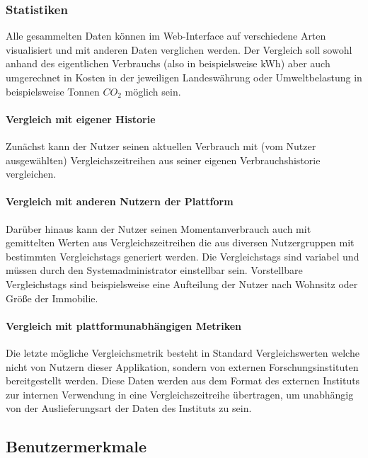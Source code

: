 \subsubsection{Statistiken}

Alle gesammelten Daten können im Web-Interface auf verschiedene Arten visualisiert und mit anderen Daten verglichen werden. Der Vergleich soll sowohl anhand des eigentlichen Verbrauchs (also in beispielsweise kWh) aber auch umgerechnet in Kosten in der jeweiligen Landeswährung oder Umweltbelastung in beispielsweise Tonnen $CO_2$ möglich sein.

\paragraph{Vergleich mit eigener Historie}

Zunächst kann der Nutzer seinen aktuellen Verbrauch  mit (vom Nutzer ausgewählten) Vergleichszeitreihen aus seiner eigenen Verbrauchshistorie vergleichen.


\paragraph{Vergleich mit anderen Nutzern der Plattform}
Darüber hinaus kann der Nutzer seinen Momentanverbrauch auch mit gemittelten Werten aus Vergleichszeitreihen die aus diversen Nutzergruppen mit bestimmten Vergleichstags generiert werden. Die Vergleichstags sind variabel und müssen durch den Systemadministrator einstellbar sein. Vorstellbare Vergleichstags sind beispielsweise eine Aufteilung der Nutzer nach Wohnsitz oder Größe der Immobilie.


\paragraph{Vergleich mit plattformunabhängigen Metriken}
\label{vgl_plattformunabhängig}

Die letzte mögliche Vergleichsmetrik besteht in Standard Vergleichswerten welche nicht von Nutzern dieser Applikation, sondern von externen Forschungsinstituten bereitgestellt werden.
Diese Daten werden aus dem Format des externen Instituts zur internen Verwendung in eine Vergleichszeitreihe übertragen, um unabhängig von der Auslieferungsart der Daten des Instituts zu sein.

\subsection{Benutzermerkmale}\label{sec:desc_user}

